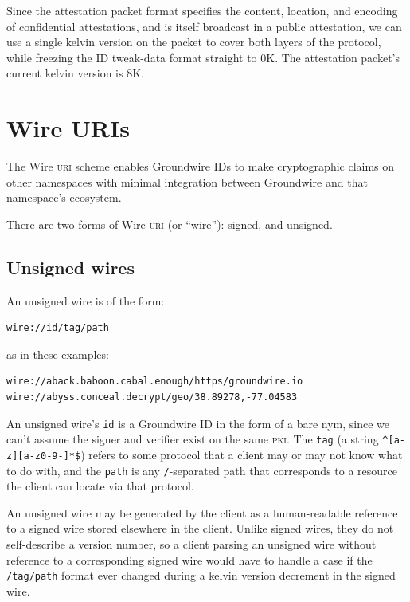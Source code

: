 \documentclass[twoside]{article}
\begin{document}
Since the attestation packet format specifies the content, location, and
encoding of confidential attestations, and is itself broadcast in a
public attestation, we can use a single kelvin version on the packet to
cover both layers of the protocol, while freezing the ID tweak-data
format straight to 0K. The attestation packet's current kelvin version
is 8K.

\section[Wire \textsc{uri}s]{Wire URIs}\label{wire-uris}

The Wire \textsc{uri} scheme enables Groundwire IDs to make cryptographic claims
on other namespaces with minimal integration between Groundwire and that
namespace's ecosystem.

There are two forms of Wire \textsc{uri} (or ``wire''): signed, and unsigned.

\subsection{Unsigned wires}\label{unsigned-wires}

An unsigned wire is of the form:

\begin{lstlisting}[style=listingblock]
wire://id/tag/path
\end{lstlisting}

\noindent
as in these examples:

\begin{lstlisting}[style=listingblock]
wire://aback.baboon.cabal.enough/https/groundwire.io
wire://abyss.conceal.decrypt/geo/38.89278,-77.04583
\end{lstlisting}

An unsigned wire's \texttt{id} is a Groundwire ID in the form of a bare
nym, since we can't assume the signer and verifier exist on the same
\textsc{pki}. The \texttt{tag} (a string \texttt{\^{}{[}a-z{]}{[}a-z0-9-{]}*\$})
refers to some protocol that a client may or may not know what to do
with, and the \texttt{path} is any \texttt{/}-separated path that
corresponds to a resource the client can locate via that protocol.

An unsigned wire may be generated by the client as a human-readable reference to a
signed wire stored elsewhere in the client. Unlike signed wires, they do
not self-describe a version number, so a client parsing an unsigned wire
without reference to a corresponding signed wire would have to handle a
case if the \texttt{/tag/path} format ever changed during a kelvin version decrement in the
signed wire.
\end{document}
